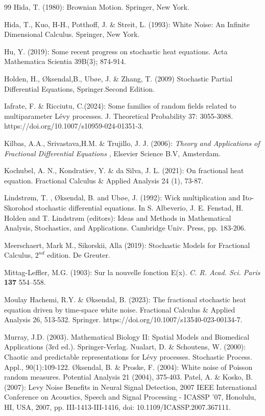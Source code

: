\documentclass[12pt]{article}%
\numberwithin{equation}{section}
\begin{document}
\begin{thebibliography}{99}
 Hida, T. (1980): Brownian Motion. Springer, New York.

 Hida, T., Kuo, H-H., Potthoff, J. \& Streit, L. (1993): White Noise: An Infinite Dimensional Calculus. Springer, New York.

    Hu, Y. (2019): Some recent progress on stochastic heat equations. Acta Mathematica Scientia 39B(3); 874-914.
   
Holden, H., \O ksendal,B., Ub\o e, J. \& Zhang, T. (2009)  Stochastic Partial Differential Equations, Springer.Second Edition.

  Iafrate, F. \& Ricciutu, C.(2024): Some families of random fields related to multiparameter L\' evy processes. J. Theoretical Probability 37: 3055-3088. https://doi.org/10.1007/s10959-024-01351-3.
 
  Kilbas, A.A., Srivastava,H.M. \& Trujillo, J. J. (2006): 
	 {\emph{ Theory and Applications of Fractional Differential Equations }}, Elsevier  Science B.V, Amsterdam. 
     
 Kochubel, A. N., Kondratiev, Y. \& da Silva, J. L. (2021): On fractional heat equation. Fractional Calculus \& Applied Analysis 24 (1), 73-87.

 Lindstr\o m, T. , \O ksendal, B. and Ub\o e, J.  (1992): Wick multiplication and Ito-
Skorohod stochastic differential equations. In S. Albeverio, J. E. Fenstad, H. Holden
and T. Lindstr\o m (editors): Ideas and Methods in Mathematical Analysis, Stochastics,
and Applications. Cambridge Univ. Press, pp. 183-206.

    Meerschaert, Mark M., Sikorskii, Alla (2019): Stochastic Models for Fractional Calculus, $2^{nd}$ edition. De Greuter.
   
    Mittag-Leffler, M.G. (1903): Sur la nouvelle fonction E(x). \emph{C. R. Acad. Sci. Paris} {\bf 137} 554--558.
   
   Moulay Hachemi, R.Y.  \& \O ksendal, B. (2023): The fractional stochastic heat equation
driven by time-space white noise. Fractional Calculus \& Applied Analysis 26, 513-532. Springer.
https://doi.org/10.1007/s13540-023-00134-7.

Murray, J.D. (2003).
 Mathematical Biology II: Spatial Models and Biomedical Applications (3rd ed.). Springer-Verlag.
 Nualart, D. \& Schoutens, W. (2000): Chaotic and predictable representations for L\'evy processes.
Stochastic Process. Appl., 90(1):109-122.
 \O ksendal, B. \& Proske, F. (2004):
White noise of Poisson random measures. 
Potential Analysis 21 (2004), 375-403.
 Patel, A. \& Kosko, B. (2007): Levy Noise Benefits in Neural Signal Detection, 2007 IEEE International Conference on Acoustics, Speech and Signal Processing - ICASSP '07, Honolulu, HI, USA, 2007, pp. III-1413-III-1416, doi: 10.1109/ICASSP.2007.367111.  
\end{thebibliography}
\end{document}
